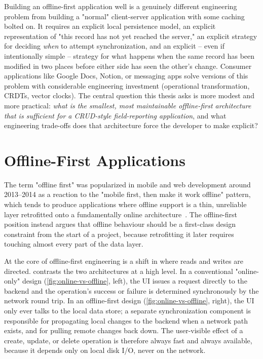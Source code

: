 Building an offline-first application well is a genuinely different
engineering problem from building a "normal" client-server application with
some caching bolted on. It requires an explicit local persistence model,
an explicit representation of "this record has not yet reached the
server," an explicit strategy for deciding \emph{when} to attempt
synchronization, and an explicit -- even if intentionally simple --
strategy for what happens when the same record has been modified in two
places before either side has seen the other's change. Consumer
applications like Google Docs, Notion, or messaging apps solve versions of
this problem with considerable engineering investment (operational
transformation, CRDTs, vector clocks). The central question this thesis
asks is more modest and more practical: \emph{what is the smallest,
most maintainable offline-first architecture that is sufficient for a
CRUD-style field-reporting application}, and what engineering trade-offs
does that architecture force the developer to make explicit?

\section{Offline-First Applications}
\label{sec:offline-first-background}

The term "offline first" was popularized in mobile and web development
around 2013--2014 as a reaction to the "mobile first, then make it work
offline" pattern, which tends to produce applications where offline support
is a thin, unreliable layer retrofitted onto a fundamentally online
architecture~\cite{offlinefirst2013}. The offline-first position instead
argues that offline behaviour should be a first-class design constraint
from the start of a project, because retrofitting it later requires
touching almost every part of the data layer.

At the core of offline-first engineering is a shift in where reads and
writes are directed.  contrasts the two
architectures at a high level. In a conventional "online-only" design
(\cref{fig:online-vs-offline}, left), the UI issues a request directly to
the backend and the operation's success or failure is determined
synchronously by the network round trip. In an offline-first design
(\cref{fig:online-vs-offline}, right), the UI only ever talks to the local
data store; a separate synchronization component is responsible for
propagating local changes to the backend when a network path exists, and
for pulling remote changes back down. The user-visible effect of a create,
update, or delete operation is therefore always fast and always available,
because it depends only on local disk I/O, never on the network.

